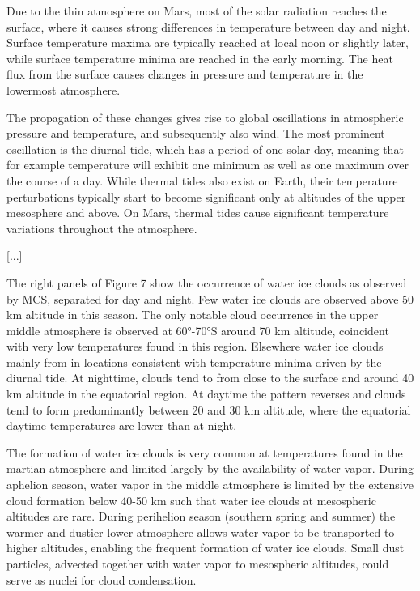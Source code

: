 \documentclass[a4paper,10pt,openany,oneside]{memoir}
\begin{document}
Due to the thin atmosphere on Mars, most of the solar radiation reaches the surface, where it causes strong differences in temperature between day and night. Surface temperature maxima are typically reached at local noon or slightly later, while surface temperature minima are reached in the early morning. The heat flux from the surface causes changes in pressure and temperature in the lowermost atmosphere. 

The propagation of these changes gives rise to global oscillations in atmospheric pressure and temperature, and subsequently also wind. The most prominent oscillation is the diurnal tide, which has a period of one solar day, meaning that for example temperature will exhibit one minimum as well as one maximum over the course of a day. While thermal tides also exist on Earth, their temperature perturbations typically start to become significant only at altitudes of the upper mesosphere and above. On Mars, thermal tides cause significant temperature variations throughout the atmosphere.

[...]

The right panels of Figure 7 show the occurrence of water ice clouds as observed by MCS, separated for day and night. Few water ice clouds are observed above 50 km altitude in this season. The only notable cloud occurrence in the upper middle atmosphere is observed at 60°-70°S around 70 km altitude, coincident with very low temperatures found in this region. Elsewhere water ice clouds mainly from in locations consistent with temperature minima driven by the diurnal tide. At nighttime, clouds tend to from close to the surface and around 40 km altitude in the equatorial region. At daytime the pattern reverses and clouds tend to form predominantly between 20 and 30 km altitude, where the equatorial daytime temperatures are lower than at night. 

The formation of water ice clouds is very common at temperatures found in the martian atmosphere and limited largely by the availability of water vapor. During aphelion season, water vapor in the middle atmosphere is limited by the extensive cloud formation below 40-50 km such that water ice clouds at mesospheric altitudes are rare. During perihelion season (southern spring and summer) the warmer and dustier lower atmosphere allows water vapor to be transported to higher altitudes, enabling the frequent formation of water ice clouds. Small dust particles, advected together with water vapor to mesospheric altitudes, could serve as nuclei for cloud condensation. 
\end{document}
